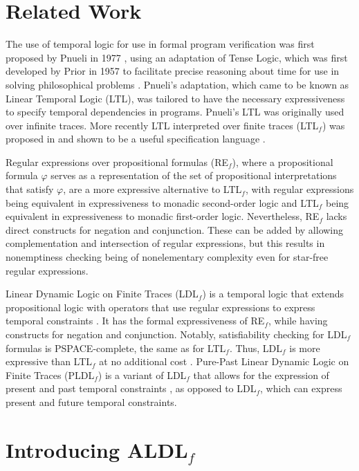 \documentclass{lmcs}
\theoremstyle{definition}
\DeclareMathOperator{\?}{?}
\begin{document}
\section{Related Work}
\label{ch:relatedwork}
The use of temporal logic for use in formal program verification was first proposed by Pnueli in 1977 \cite{pnueli77}, using an adaptation of Tense Logic, which was first developed by Prior in 1957 to facilitate precise reasoning about time for use in solving philosophical problems \cite{prior57}. Pnueli's adaptation, which came to be known as Linear Temporal Logic (LTL), was tailored to have the necessary expressiveness to specify temporal dependencies in programs. Pnueli's LTL was originally used over infinite traces. More recently LTL interpreted over finite traces (LTL$_f$) was proposed in \cite{ldlf} and shown to be a useful specification language \cite{aalst,bienvenu,gabaldon,pevsic,wilke}.

Regular expressions over propositional formulas (RE$_f$), where a propositional formula $\varphi$ serves as a representation of the set of propositional interpretations that satisfy $\varphi$, are a more expressive alternative to LTL$_f$, with regular expressions being equivalent in expressiveness to monadic second-order logic and LTL$_f$ being equivalent in expressiveness to monadic first-order logic. Nevertheless, RE$_f$ lacks direct constructs for negation and conjunction. These can be added by allowing complementation and intersection of regular expressions, but this results in nonemptiness checking being of nonelementary complexity even for star-free regular expressions.

Linear Dynamic Logic on Finite Traces (LDL$_f$) is a temporal logic that extends propositional logic with operators that use regular expressions to express temporal constraints \cite{ldlf}. It has the formal expressiveness of RE$_f$, while having constructs for negation and conjunction. Notably, satisfiability checking for LDL$_f$ formulas is PSPACE-complete, the same as for LTL$_f$. Thus, LDL$_f$ is more expressive than LTL$_f$ at no additional cost \cite{ldlf}. Pure-Past Linear Dynamic Logic on Finite Traces (PLDL$_f$) is a variant of LDL$_f$ that allows for the expression of present and past temporal constraints \cite{pldlf}, as opposed to LDL$_f$, which can express present and future temporal constraints.

\section{\texorpdfstring{Introducing ALDL$_f$}{Introducing ALDLf}}
\end{document}
